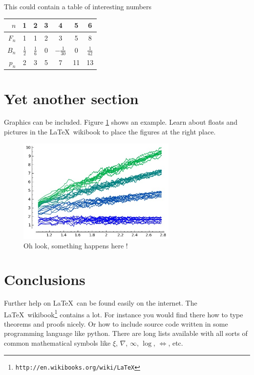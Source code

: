 \documentclass{uonmathreport}
\begin{document}
This could contain a table of interesting numbers
\begin{center}
  \begin{tabular}{r|cccccc}
    $n$   & 1 & 2 & 3 & 4 & 5 & 6 \\ \hline
    $F_n$ & 1 & 1 & 2 & 3 & 5 & 8 \\
    $B_n$ & $\tfrac{1}{2}$ & $\tfrac{1}{6}$ & 0 & $-\tfrac{1}{30}$ & 0 &  $\tfrac{1}{42}$ \\
    $p_n$ & 2 & 3& 5& 7 & 11 & 13 \\
  \end{tabular}
\end{center}

\section{Yet another section} \label{sec:my2}

Graphics can be included. Figure \ref{fig:bsd} shows an example.
Learn about floats and pictures in the \LaTeX\ wikibook to place
the figures at the right place.
%
\begin{figure}
 \begin{center}
   \includegraphics[width=0.7\textwidth]{bsd.jpg}
 \end{center}
 \caption{Oh look, something happens here !}
 \label{fig:bsd}
\end{figure}

\section{Conclusions} \label{sec:conclusions}

Further help on \LaTeX\ can be found easily on the internet. The \LaTeX\
wikibook\footnote{\tt http://en.wikibooks.org/wiki/LaTeX} contains a lot.
For instance you would find there how to type theorems and proofs nicely.
Or how to include source code written in some programming language like
python. There are long lists available with all sorts of common
mathematical symbols like $\xi$, $\nabla$, $\infty$, $\log$, $\iff$, etc.
\end{document}
